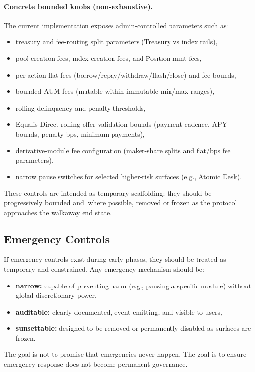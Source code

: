 \documentclass[version=preprint]{iacrcc}
\begin{document}
\paragraph{Concrete bounded knobs (non-exhaustive).}
The current implementation exposes admin-controlled parameters such as:
\begin{itemize}
  \item treasury and fee-routing split parameters (Treasury vs index rails),
  \item pool creation fees, index creation fees, and Position mint fees,
  \item per-action flat fees (borrow/repay/withdraw/flash/close) and fee bounds,
  \item bounded AUM fees (mutable within immutable min/max ranges),
  \item rolling delinquency and penalty thresholds,
  \item Equalis Direct rolling-offer validation bounds (payment cadence, APY bounds, penalty bps, minimum payments),
  \item derivative-module fee configuration (maker-share splits and flat/bps fee parameters),
  \item narrow pause switches for selected higher-risk surfaces (e.g., Atomic Desk).
\end{itemize}
These controls are intended as temporary scaffolding: they should be progressively bounded and, where possible, removed or frozen as the protocol approaches the walkaway end state.

\subsection{Emergency Controls}

If emergency controls exist during early phases, they should be treated as temporary and constrained. Any emergency mechanism should be:
\begin{itemize}
  \item \textbf{narrow:} capable of preventing harm (e.g., pausing a specific module) without global discretionary power,
  \item \textbf{auditable:} clearly documented, event-emitting, and visible to users,
  \item \textbf{sunsettable:} designed to be removed or permanently disabled as surfaces are frozen.
\end{itemize}

The goal is not to promise that emergencies never happen. The goal is to ensure emergency response does not become permanent governance.
\end{document}
